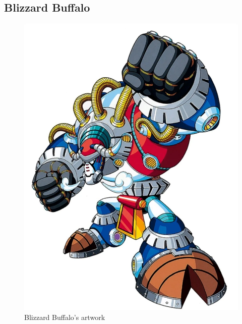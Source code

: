 \subsection{Blizzard Buffalo}\label{boss:Blizzard_buffalo}
\begin{figure}[htp]
	\centering
	\includegraphics[height=\portraitsize]{figures/X3/Blizzard_buffalo/blizzardbuffalo.png}
	\caption{Blizzard Buffalo's artwork~\cite{book:MMX_Complete_art}}
\end{figure}

